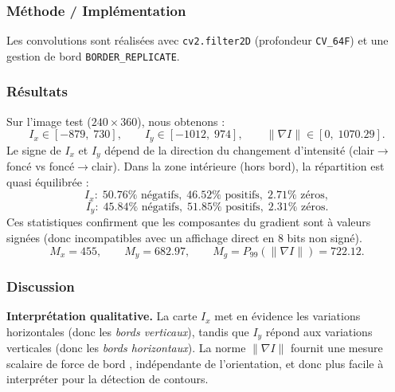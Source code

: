 \documentclass[11pt,a4paper]{article}
\begin{document}
\subsubsection{Méthode / Implémentation}
Les convolutions sont r\'ealis\'ees avec \texttt{cv2.filter2D} (profondeur \texttt{CV\_64F}) et une gestion de bord \texttt{BORDER\_REPLICATE}.

\subsubsection{Résultats}
Sur l'image test (\(240\times 360\)), nous obtenons :
\[
I_x \in [-879,\;730],\qquad
I_y \in [-1012,\;974],\qquad
\|\nabla I\| \in [0,\;1070.29].
\]
Le signe de \(I_x\) et \(I_y\) d\'epend de la direction du changement d'intensit\'e (clair$\rightarrow$fonc\'e vs fonc\'e$\rightarrow$clair). Dans la zone int\'erieure (hors bord), la r\'epartition est quasi \'equilibr\'ee :
\[
I_x:\; 50.76\% \text{ n\'egatifs},\; 46.52\% \text{ positifs},\; 2.71\% \text{ z\'eros},
\]
\[
I_y:\; 45.84\% \text{ n\'egatifs},\; 51.85\% \text{ positifs},\; 2.31\% \text{ z\'eros}.
\]
Ces statistiques confirment que les composantes du gradient sont \`a valeurs sign\'ees (donc incompatibles avec un affichage direct en 8 bits non sign\'e).
\[
M_x = 455,\qquad M_y = 682.97,\qquad M_g = P_{99}(\|\nabla I\|)=722.12.
\]

\subsubsection{Discussion}
\textbf{Interpr\'etation qualitative.}
La carte \(I_x\) met en \'evidence les variations horizontales (donc les \emph{bords verticaux}), tandis que \(I_y\) r\'epond aux variations verticales (donc les \emph{bords horizontaux}).
La norme \(\|\nabla I\|\) fournit une mesure scalaire de \og force de bord \fg{}, ind\'ependante de l'orientation, et donc plus facile \`a interpr\'eter pour la d\'etection de contours.
\end{document}
